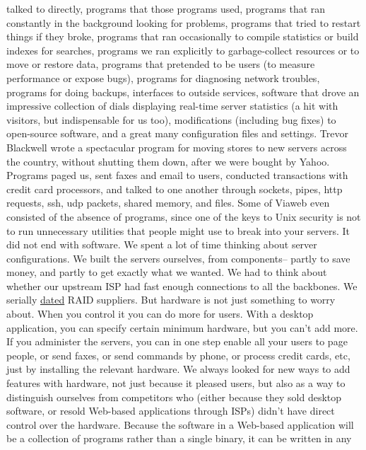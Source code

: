 talked to directly, programs that those programs used, programs
that ran constantly in the background looking for problems, programs
that tried to restart things if they broke, programs that ran
occasionally to compile statistics or build indexes for searches,
programs we ran explicitly to garbage-collect resources or to move
or restore data, programs that pretended to be users (to measure
performance or expose bugs), programs for diagnosing network
troubles, programs for doing backups, interfaces to outside services,
software that drove an impressive collection of dials displaying
real-time server statistics (a hit with visitors, but indispensable
for us too), modifications (including bug fixes) to open-source
software, and a great many configuration files and settings.  Trevor
Blackwell wrote a spectacular program for moving stores to new
servers across the country, without shutting them down, after we
were bought by Yahoo. Programs paged us, sent faxes and email to
users, conducted transactions with credit card processors, and
talked to one another through sockets, pipes, http requests, ssh,
udp packets, shared memory, and files.  Some of Viaweb even consisted
of the absence of programs, since one of the keys to Unix security
is not to run unnecessary utilities that people might use to break
into your servers.
It did not end with software.  We spent a lot of time thinking
about server configurations.  We built the servers ourselves, from
components-- partly to save money, and partly to get exactly what
we wanted.  We had to think about whether our upstream ISP had fast
enough connections to all the backbones.  We serially  
\href{http://groups.google.com/groups?selm=6hdipo\%243o0\%241\%40FreeBSD.csie.NCTU.edu.tw}{dated}
RAID suppliers.
But hardware is not just something to worry about.  When you control
it you can do more for users.  With a desktop application, you can
specify certain minimum hardware, but you can't add more.  If you
administer the servers, you can in one step enable all your users
to page people, or send faxes, or send commands by phone, or process
credit cards, etc, just by installing the relevant hardware.  We
always looked for new ways to add features with hardware, not just
because it pleased users, but also as a way to distinguish ourselves
from competitors who (either because they sold desktop software,
or resold Web-based applications through ISPs) didn't have direct
control over the hardware.
Because the software in a Web-based application will be a collection
of programs rather than a single binary, it can be written in any
